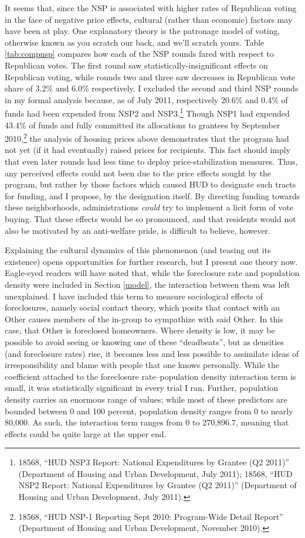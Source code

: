 \documentclass[12pt,oneside]{psthesis}
\begin{document}
It seems that, since the NSP is associated with higher rates of Republican voting in the face of negative price effects, cultural (rather than economic) factors may have been at play.
One explanatory theory is the patronage model of voting, otherwise known as you scratch our back, and we'll scratch yours.
Table \ref{tab:compnsp} compares how each of the NSP rounds fared with respect to Republican votes.
The first round saw statistically-insignificant effects on Republican voting, while rounds two and three saw decreases in Republican vote share of 3.2\% and 6.0\% respectively.
I excluded the second and third NSP rounds in my formal analysis because, as of July 2011, respectively 20.6\% and 0.4\% of funds had been expended from NSP2 and NSP3.\footnote{18568, ``HUD NSP3 Report: National Expenditures by Grantee (Q2 2011)'' (Department of Housing and Urban Development, July 2011); 18568, ``HUD NSP2 Report: National Expenditures by Grantee (Q2 2011)'' (Department of Housing and Urban Development, July 2011).}
Though NSP1 had expended 43.4\% of funds and fully committed its allocations to grantees by September 2010,\footnote{18568, ``HUD NSP-1 Reporting Sept 2010: Program-Wide Detail Report'' (Department of Housing and Urban Development, November 2010).} the analysis of housing prices above demonstrates that the program had not yet (if it had eventually) raised prices for recipients.
This fact should imply that even later rounds had less time to deploy price-stabilization measures.
Thus, any perceived effects could not been due to the price effects sought by the program, but rather by those factors which caused HUD to designate such tracts for funding, and I propose, by the designation itself.
By directing funding towards these neighborhoods, administrations \emph{could} try to implement a licit form of vote buying.
That these effects would be so pronounced, and that residents would not also be motivated by an anti-welfare pride, is difficult to believe, however.

Explaining the cultural dynamics of this phenomenon (and teasing out its existence) opens opportunities for further research, but I present one theory now.
Eagle-eyed readers will have noted that, while the foreclosure rate and population density were included in Section \ref{model}, the interaction between them was left unexplained.
I have included this term to measure sociological effects of foreclosures, namely social contact theory, which posits that contact with an Other causes members of the in-group to sympathize with said Other.
In this case, that Other is foreclosed homeowners.
Where density is low, it may be possible to avoid seeing or knowing one of these ``deadbeats'', but as densities (and foreclosure rates) rise, it becomes less and less possible to assimilate ideas of irresponsibility and blame with people that one knows personally.
While the coefficient attached to the foreclosure rate--population density interaction term is small, it was statistically significant in every trial I ran.
Further, population density carries an enormous range of values; while most of these predictors are bounded between 0 and 100 percent, population density ranges from 0 to nearly 80,000.
As such, the interaction term ranges from 0 to 270,896.7, meaning that effects could be quite large at the upper end.
\end{document}
